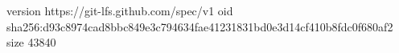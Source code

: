 version https://git-lfs.github.com/spec/v1
oid sha256:d93c8974cad8bbc849e3c794634fae41231831bd0e3d14cf410b8fdc0f680af2
size 43840
